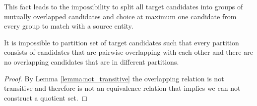 This fact leads to the impossibility to split all target candidates into groups of mutually
overlapped candidates and choice at maximum one candidate from every group to match with a source entity.
\begin{corollary}
    It is impossible to partition set of target candidates such that every partition consists of
    candidates that are pairwise overlapping with each other and there are no overlapping candidates
    that are in different partitions.
\end{corollary}
\begin{proof}
    By Lemma \ref{lemma:not_transitive} the overlapping relation is not transitive and therefore
    is not an equivalence relation that implies we can not construct a quotient set.
\end{proof}

